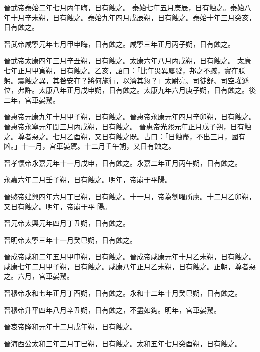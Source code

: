 \begin{pinyinscope}
 晉武帝泰始二年七月丙午晦，日有蝕之。
 泰始七年五月庚辰，日有蝕之。泰始八年十月辛未朔，日有蝕之。泰始九年四月戊辰朔，日有蝕之。泰始十年三月癸亥，日有蝕之。



 晉武帝咸寧元年七月甲申晦，日有蝕之。咸寧三年正月丙子朔，日有蝕之。



 晉武帝太康四年三月辛丑朔，日有蝕之。太康六年八月丙戌朔，日有蝕之。
 太康七年正月甲寅朔，日有蝕之。乙亥，詔曰：「比年災異屢發，邦之不臧，實在朕躬。震蝕之異，其咎安在？將何施行，以濟其愆？」太尉亮、司徒舒、司空瓘遜位，弗許。太康八年正月戊申朔，日有蝕之。太康九年六月庚子朔，日有蝕之。後二年，宮車晏駕。



 晉惠帝元康九年十月甲子朔，日有蝕之。晉惠帝永康元年四月辛卯朔，日有蝕之。晉惠帝永寧元年閏三月丙戌朔，日有蝕之。
 晉惠帝光熙元年正月戊子朔，日有蝕之。尊者惡之。七月乙酉朔，又日有蝕之既。占曰：「日蝕盡，不出三月，國有凶。」十一月，宮車晏駕。十二月壬午朔，又日有蝕之。



 晉孝懷帝永嘉元年十一月戊申，日有蝕之。永嘉二年正月丙午朔，日有蝕之。



 永嘉六年二月壬子朔，日有蝕之。明年，帝崩于平陽。



 晉愍帝建興四年六月丁巳朔，日有蝕之。十一月，帝為劉曜所虜。十二月乙卯朔，又日有蝕之。明年，帝崩于平
 陽。



 晉元帝太興元年四月丁丑朔，日有蝕之。



 晉明帝太寧三年十一月癸巳朔，日有蝕之。



 晉成帝咸和二年五月甲申朔，日有蝕之。晉成帝咸康元年十月乙未朔，日有蝕之。咸康七年二月甲子朔，日有蝕之。咸康八年正月乙未朔，日有蝕之。正朝，尊者惡之。六月，宮車晏駕。



 晉穆帝永和七年正月丁酉朔，日有蝕之。永和十二年十月癸巳朔，日有蝕之。



 晉穆帝升平四年八月辛丑朔，日有蝕之，不盡如鉤。明年，宮車晏駕。



 晉哀帝隆和元年十二月戊午朔，日有蝕之。



 晉海西公太和三年三月丁巳朔，日有蝕之。太和五年七月癸酉朔，日有蝕之。




\end{pinyinscope}
